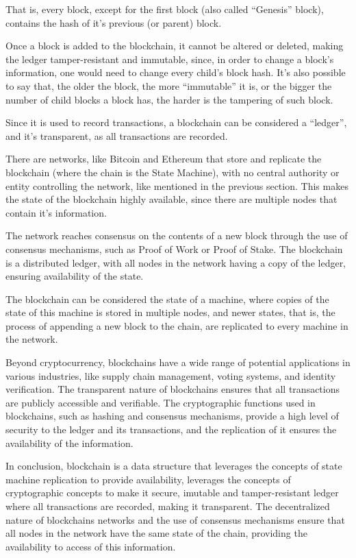 That is, every block, except for the first block (also called ``Genesis'' block), contains the hash of it's previous (or parent) block.

Once a block is added to the blockchain, it cannot be altered or deleted, making the ledger tamper-resistant and immutable, since, in order to change a block's information, one would need to change every child's block hash.
It's also possible to say that, the older the block, the more ``immutable'' it is, or the bigger the number of child blocks a block has, the harder is the tampering of such block.

Since it is used to record transactions, a blockchain can be considered a ``ledger'', and it's transparent, as all transactions are recorded.

There are networks, like Bitcoin and Ethereum that store and replicate the blockchain (where the chain is the State Machine), with no central authority or entity controlling the network, like mentioned in the previous section. This makes the state of the blockchain highly available, since there are multiple nodes that contain it's information. 

The network reaches consensus on the contents of a new block through the use of consensus mechanisms, such as Proof of Work or Proof of Stake.
The blockchain is a distributed ledger, with all nodes in the network having a copy of the ledger, ensuring availability of the state.

The blockchain can be considered the state of a machine, where copies of the state of this machine is stored in multiple nodes, and newer states, that is, the process of appending a new block to the chain, are replicated to every machine in the network.

Beyond cryptocurrency, blockchains have a wide range of potential applications in various industries, like supply chain management, voting systems, and identity verification. The transparent nature of blockchains ensures that all transactions are publicly accessible and verifiable. The cryptographic functions used in blockchains, such as hashing and consensus mechanisms, provide a high level of security to the ledger and its transactions, and the replication of it ensures the availability of the information.

In conclusion, blockchain is a data structure that leverages the concepts of state machine replication to provide availability, leverages the concepts of cryptographic concepts to make it secure, imutable and tamper-resistant ledger where all transactions are recorded, making it transparent.
The decentralized nature of blockchains networks and the use of consensus mechanisms ensure that all nodes in the network have the same state of the chain, providing the availability to access of this information.

